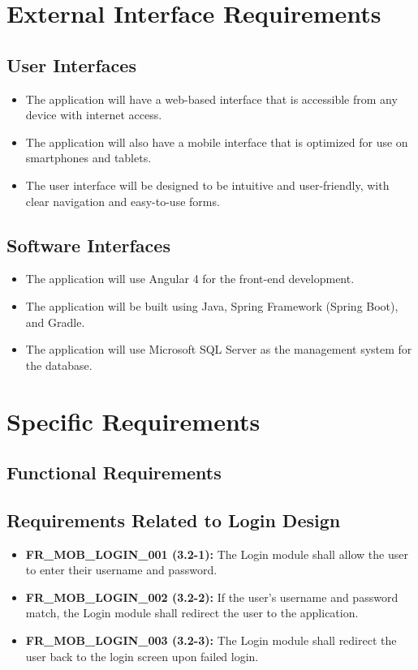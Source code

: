 \documentclass[12pt]{article}
\begin{document}
\section{External Interface Requirements}
\subsection{User Interfaces}
\begin{itemize}
     \item The application will have a web-based interface that is accessible from any device with internet access.
     \item The application will also have a mobile interface that is optimized for use on smartphones and tablets.
     \item The user interface will be designed to be intuitive and user-friendly, with clear navigation and easy-to-use forms.
\end{itemize}
\subsection{Software Interfaces}
\begin{itemize}
     \item The application will use Angular 4 for the front-end development.
     \item The application will be built using Java, Spring Framework (Spring Boot), and Gradle.
     \item The application will use Microsoft SQL Server as the management system for the database.
\end{itemize}
\newpage

\section{Specific Requirements}

\subsection{Functional Requirements}

\subsection{Requirements Related to Login Design}

\begin{itemize}
    \item \textbf{FR\_MOB\_LOGIN\_001 (3.2-1):} The Login module shall allow the user to enter their username and password.
    \item \textbf{FR\_MOB\_LOGIN\_002 (3.2-2):} If the user's username and password match, the Login module shall redirect the user to the application.
    \item \textbf{FR\_MOB\_LOGIN\_003 (3.2-3):} The Login module shall redirect the user back to the login screen upon failed login.
\end{itemize}
\end{document}
